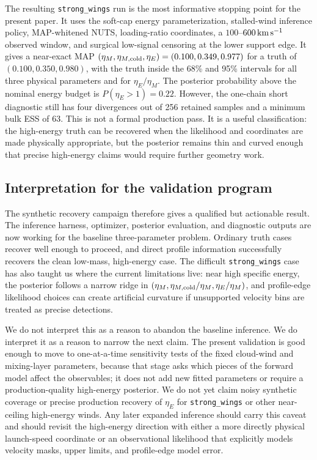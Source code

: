 The resulting \texttt{strong\_wings} run is the most informative stopping point
for the present paper.  It uses the soft-cap energy parameterization,
stalled-wind inference policy, MAP-whitened NUTS, loading-ratio coordinates, a
$100$--$600\,{\rm km\,s^{-1}}$ observed window, and surgical low-signal censoring
at the lower support edge.  It gives a near-exact MAP
$(\eta_M,\eta_{M,\rm cold},\eta_E)=(0.100,0.349,0.977)$ for a truth of
$(0.100,0.350,0.980)$, with the truth inside the 68\% and 95\% intervals for
all three physical parameters and for $\eta_E/\eta_M$.  The posterior probability
above the nominal energy budget is $P(\eta_E>1)=0.22$.  However, the one-chain
short diagnostic still has four divergences out of 256 retained samples and a
minimum bulk ESS of 63.  This is not a formal production pass.  It is a useful
classification: the high-energy truth can be recovered when the likelihood and
coordinates are made physically appropriate, but the posterior remains thin and
curved enough that precise high-energy claims would require further geometry
work.

\subsection{Interpretation for the validation program}
\label{subsec:synthetic_recovery_interpretation}

The synthetic recovery campaign therefore gives a qualified but actionable
result.  The inference harness, optimizer, posterior evaluation, and diagnostic
outputs are now working for the baseline three-parameter problem.  Ordinary
truth cases recover well enough to proceed, and direct profile information
successfully recovers the clean low-mass, high-energy case.  The difficult
\texttt{strong\_wings} case has also taught us where the current limitations
live: near high specific energy, the posterior follows a narrow ridge in
$(\eta_M,\eta_{M,\rm cold}/\eta_M,\eta_E/\eta_M)$, and profile-edge likelihood
choices can create artificial curvature if unsupported velocity bins are treated
as precise detections.

We do not interpret this as a reason to abandon the baseline inference.  We do
interpret it as a reason to narrow the next claim.  The present validation is
good enough to move to one-at-a-time sensitivity tests of the fixed cloud-wind
and mixing-layer parameters, because that stage asks which pieces of the forward
model affect the observables; it does not add new fitted parameters or require a
production-quality high-energy posterior.  We do not yet claim noisy synthetic
coverage or precise production recovery of $\eta_E$ for \texttt{strong\_wings}
or other near-ceiling high-energy winds.  Any later expanded inference should
carry this caveat and should revisit the high-energy direction with either a
more directly physical launch-speed coordinate or an observational likelihood
that explicitly models velocity masks, upper limits, and profile-edge model
error.

\clearpage

